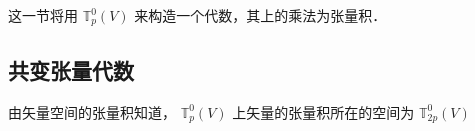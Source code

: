 
这一节将用 $\mathbb T_p^0(V)$ 来构造一个代数，其上的乘法为张量积．
\subsection{共变张量代数}
由矢量空间的张量积知道， $\mathbb T_p^0(V)$ 上矢量的张量积所在的空间为  $\mathbb T_{2p}^0(V)$ 